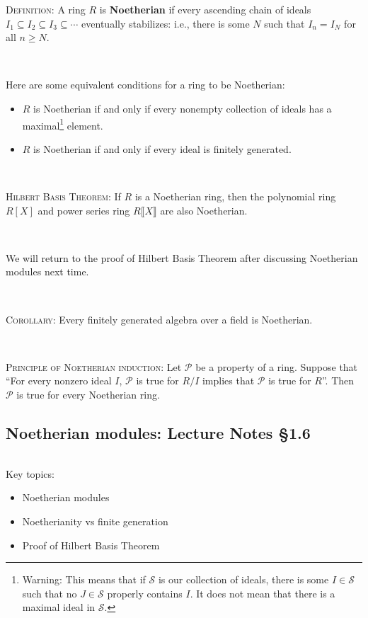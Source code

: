 \documentclass[12pt]{amsart}
\newcommand{\0}{$\phantom{.}$}
\newcommand{\1}{\mathbbm{1}}
\begin{document}
\noindent \textsc{Definition:} A ring $R$ is \textbf{Noetherian} if every ascending chain of ideals $I_1 \subseteq I_2 \subseteq I_3 \subseteq \cdots$ eventually stabilizes: i.e., there is some $N$ such that $I_n=I_N$ for all $n\geq N$.

\

\noindent Here are some equivalent conditions for a ring to be Noetherian:

\begin{itemize}
\item $R$ is Noetherian if and only if every nonempty collection of ideals has a maximal\footnote{Warning: This means that if $\mathcal{S}$ is our collection of ideals, there is some $I\in \mathcal{S}$ such that no $J\in \mathcal{S}$ properly contains $I$. It does not mean that there is a maximal ideal in $\mathcal{S}$.} element.
\item $R$ is Noetherian if and only if every ideal is finitely generated.
\end{itemize}

\



\noindent \textsc{Hilbert Basis Theorem:} If $R$ is a Noetherian ring, then the polynomial ring $R[X]$ and power series ring $R\llbracket X \rrbracket$ are also Noetherian.

\

\noindent We will return to the proof of Hilbert Basis Theorem after discussing Noetherian modules next time.

\


\noindent \textsc{Corollary:} Every finitely generated algebra over a field is Noetherian.

\

\noindent \textsc{Principle of Noetherian induction:} Let $\mathcal{P}$ be a property of a ring. Suppose that ``For every nonzero ideal $I$, $\mathcal{P}$ is true for $R/I$  implies that $\mathcal{P}$ is true for $R$''. Then $\mathcal{P}$ is true for every Noetherian ring.



\newpage
\subsection{Noetherian modules:  Lecture Notes \S1.6} \0

\begin{framed} Key topics:
\begin{itemize}
\item Noetherian modules
\item Noetherianity vs finite generation
\item Proof of Hilbert Basis Theorem
\end{itemize}
\end{framed}
\end{document}
